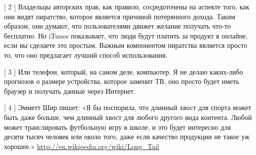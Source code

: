 \documentclass[ebook,12pt,oneside,openany]{memoir}
\begin{document}
[ 2 ] Владельцы авторских прав, как правило, сосредоточены на аспекте
того, как они видят пиратство, которое является причиной потерянного
дохода. Таким образом, они думают, что пользователями движет желание
получать что-то бесплатно. Но iTunes показывает, что люди будут
платить за продукт в онлайне, если вы сделаете это простым. Важным
компонентом пиратства является просто то, что оно предлагает лучший
способ использования.

[ 3 ] Или телефон, который, на самом деле, компьютер. Я не делаю
каких-либо прогнозов о размере устройства, которое заменит ТВ, оно
просто будет иметь браузер и получать данные через Интернет.

[ 4 ] Эмметт Шир пишет: «Я бы поспорила, что длинный хвост для спорта
может быть даже больше, чем длинный хвост для любого другого вида
контента. Любой может транслировать футбольную игру в школе, и это
будет интересно для десяти тысяч человек или около того, даже если
качество продукции не такое уж хорошее.»
\url{http://en.wikipedia.org/wiki/Long_Tail}
\end{document}
